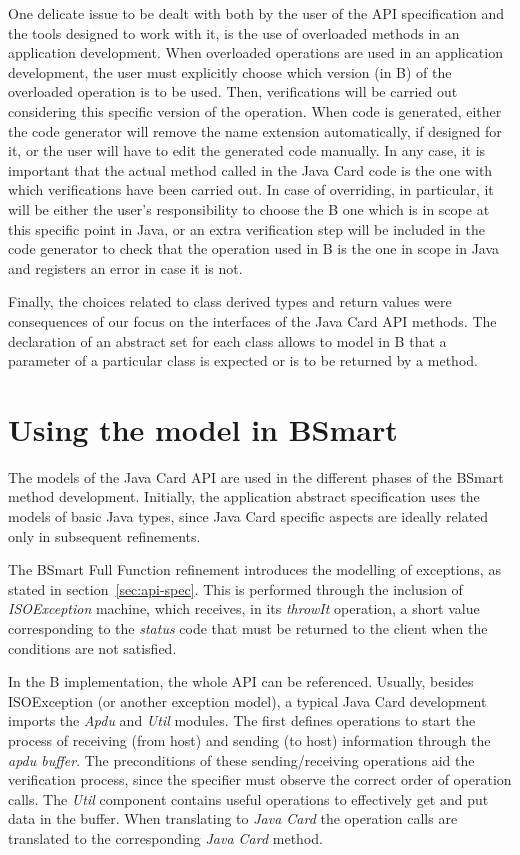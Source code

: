 \documentclass{entcs}
\begin{document}
One delicate issue to be dealt with both by the user of the API
specification and the tools designed to work with it, is the use of
overloaded methods in an application development. When overloaded
operations are used in an application development, the user must
explicitly choose which version (in B) of the overloaded operation is to be
used. Then, verifications will be carried out considering this
specific version of the operation. When code is generated, either the
code generator will remove the name extension automatically, if
designed for it, or the user will have to edit the generated code
manually. In any case, it is important that the actual method called
in the Java Card code is the one with which verifications have been
carried out.  In case of overriding, in particular, it will be either
the user's responsibility to choose the B one which is in scope at
this specific point in Java, or an extra verification step will be
included in the code generator to check that the operation used in
B is the one in scope in Java and registers an error in case it is
not.

Finally, the choices related to class derived types and return values were consequences of our focus on the interfaces of the Java Card API methods. The declaration of an abstract set for each class allows to model in B that a parameter of a particular class is expected or is to be returned by a method. 




\section{Using the model in BSmart}

The models of the Java Card API are used in the different phases of the 
BSmart method development. Initially, the application 
abstract specification uses the models of basic Java types, 
since Java Card specific aspects are ideally related only
in subsequent refinements.

The BSmart Full Function refinement introduces the modelling of exceptions, 
as stated in section~\ref{sec:api-spec}. This is performed through  the inclusion
of \emph{ISOException} machine, which receives, in its \emph{throwIt} operation, 
a short value corresponding to the \emph{status} code that must be returned to 
the client when the conditions are not satisfied.  

In the B implementation, the whole API can be referenced. Usually,
besides ISOException (or another exception model), a typical Java Card
development imports the \emph{Apdu} and \emph{Util} modules. The first
defines operations to start the process of receiving (from host) and
sending (to host) information through the \emph{apdu buffer}. The
preconditions of these sending/receiving operations aid the
verification process, since the specifier must observe the correct
order of operation calls. The \emph{Util} component contains useful
operations to effectively get and put data in the buffer. When
translating to \emph{Java Card} the operation calls are translated
to the corresponding \emph{Java Card} method.
\end{document}
